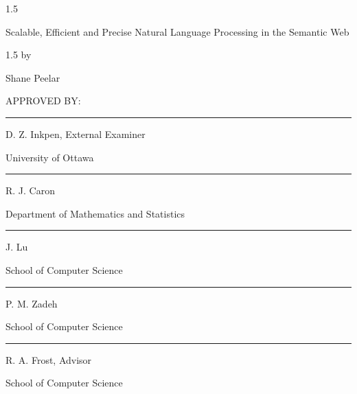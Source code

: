 \documentclass[fleqn, oneside, 12pt]{book}
\theoremstyle{definitionsty}
\newcommand{\uwinonehalfspacelen}{1.5}
\newenvironment{uwinonehalfspaceenv}%
{\begin{spacing}{\uwinonehalfspacelen}}%
	{\end{spacing}}
\newcommand{\dtitle}{Scalable, Efficient and Precise Natural Language Processing in the Semantic Web}
\begin{document}


\clearpage
\thispagestyle{empty}

\begin{center}
	\begin{uwinonehalfspaceenv}
		\parbox{6in}{\centering\dtitle}
	\end{uwinonehalfspaceenv}


	\vspace{0.35cm}
	\begin{uwinonehalfspaceenv}
		by

		\vspace{0.35cm}

		{Shane Peelar}
	\end{uwinonehalfspaceenv}



	\vspace{0.5in}

	APPROVED BY:

	\vspace{0.5in}

	\noindent\rule{4in}{0.4pt}

	D. Z. Inkpen, External Examiner

	University of Ottawa

	\vspace{0.5in}

	\noindent\rule{4in}{0.4pt}

	R. J. Caron

	Department of Mathematics and Statistics

	\vspace{0.5in}

	\noindent\rule{4in}{0.4pt}

	J. Lu

	School of Computer Science

	\vspace{0.5in}

	\noindent\rule{4in}{0.4pt}

	P. M. Zadeh

    School of Computer Science

    \vspace{0.5in}

    \noindent\rule{4in}{0.4pt}

	R. A. Frost, Advisor

	School of Computer Science

	\vspace{0.5in}

\end{center}
\end{document}
